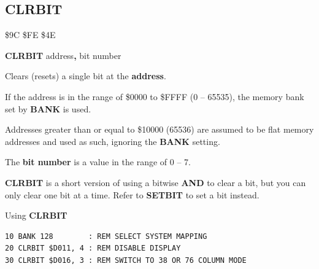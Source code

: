 \subsection{CLRBIT}
\begin{description}[leftmargin=2cm,style=nextline]
\item [Token:]   \$9C \$FE \$4E

\item [Format:]  {\bf CLRBIT} address{\bf,} bit number

\item [Usage:]   Clears (resets) a single bit at the {\bf address}.

                 If the address is in the range of \$0000 to \$FFFF (0 -- 65535), the memory bank set by {\bf BANK} is used.

                 Addresses greater than or equal to \$10000 (65536) are assumed to be flat memory addresses and used as such, ignoring the {\bf BANK} setting.

                 The {\bf bit number} is a value in the range of 0 -- 7.

\item [Remarks:] {\bf CLRBIT} is a short version of using a bitwise {\bf AND} to clear a bit, but you can only clear one bit at a time. Refer to {\bf SETBIT} to set a bit instead.

\item [Example:] Using {\bf CLRBIT}

\begin{tcolorbox}[colback=black,coltext=white]
\verbatimfont{\codefont}
\begin{verbatim}
10 BANK 128        : REM SELECT SYSTEM MAPPING
20 CLRBIT $D011, 4 : REM DISABLE DISPLAY
30 CLRBIT $D016, 3 : REM SWITCH TO 38 OR 76 COLUMN MODE
\end{verbatim}
\end{tcolorbox}
\end{description}


\newpage
